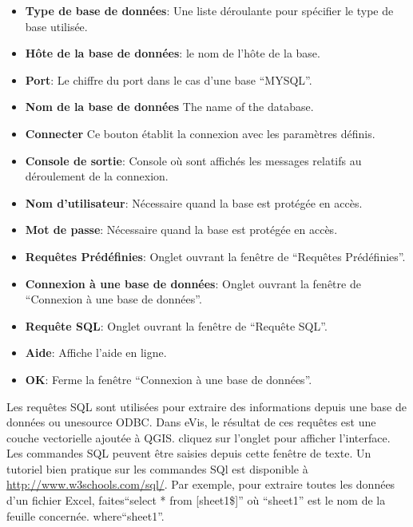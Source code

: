 \begin{itemize}
\item \textbf{Type de base de données}: Une liste déroulante pour spécifier le type de base utilisée.
\item \textbf{Hôte de la base de données}: le nom de l'hôte de la base.
\item \textbf{Port}: Le chiffre du port dans le cas d'une base ``MYSQL''.
\item \textbf{Nom de la base de données} The name of the database.
\item \textbf{Connecter} Ce bouton établit la connexion avec les paramètres définis.
\item \textbf{Console de sortie}: Console où sont affichés les messages relatifs au déroulement de la connexion.
\item \textbf{Nom d'utilisateur}: Nécessaire quand la base est protégée en accès.
\item \textbf{Mot de passe}: Nécessaire quand la base est protégée en accès.
\item \textbf{Requêtes Prédéfinies}:  Onglet ouvrant la fenêtre de ``Requêtes Prédéfinies''.
\item \textbf{Connexion à une base de données}: Onglet ouvrant la fenêtre de ``Connexion à une base de données''.
\item \textbf{Requête SQL}: Onglet ouvrant la fenêtre de ``Requête SQL''.
\item \textbf{Aide}: Affiche l'aide en ligne.
\item \textbf{OK}: Ferme la fenêtre ``Connexion à une base de données''.
\end{itemize}

\label{evis_running_sql}


Les requêtes SQL sont utilisées pour extraire des informations depuis une base de données ou unesource ODBC. Dans eVis, le résultat de ces requêtes est une couche vectorielle ajoutée à QGIS. cliquez sur l'onglet  pour afficher l'interface. Les commandes SQL peuvent être saisies depuis cette fenêtre de texte. Un tutoriel bien pratique sur les commandes SQl est disponible à \url{http://www.w3schools.com/sql/}. Par exemple, pour extraire toutes les données d'un fichier Excel, faites``select * from [sheet1\$]'' où ``sheet1'' est le nom de la feuille concernée.
where``sheet1''.

